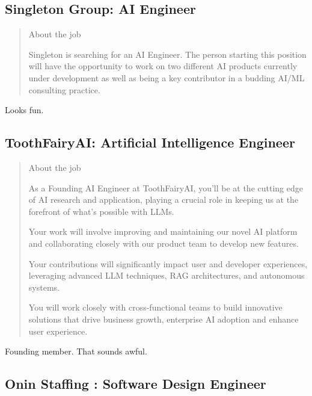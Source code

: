 \documentclass[
	letterpaper, %
	12pt, %
]{CSSullivanBusinessReport}
\begin{document}

\subsection[Singleton Group]{Singleton Group: AI Engineer}

\begin{quote}
	About the job
	
	Singleton is searching for an AI Engineer. The person starting this position will have the opportunity to work on two different AI products currently under development as well as being a key contributor in a budding AI/ML consulting practice.

\end{quote}

Looks fun. 


\subsection[ToothFairyAI]{ToothFairyAI: Artificial Intelligence Engineer}

\begin{quote}
	About the job
	
	As a Founding AI Engineer at ToothFairyAI, you'll be at the cutting edge of AI research and application, playing a crucial role in keeping us at the forefront of what's possible with LLMs. 


	Your work will involve improving and maintaining our novel AI platform and collaborating closely with our product team to develop new features. 


	Your contributions will significantly impact user and developer experiences, leveraging advanced LLM techniques, RAG architectures, and autonomous systems.

	You will work closely with cross-functional teams to build innovative solutions that drive business growth, enterprise AI adoption and enhance user experience.

\end{quote}

Founding member. That sounds awful. 


\subsection[Onin Staffing ]{Onin Staffing : Software Design Engineer}
\end{document}
